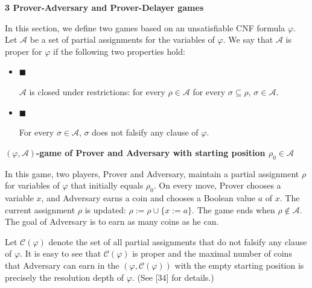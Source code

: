 \documentclass[10pt,a4paper]{article}
\begin{document}
\par\medskip\noindent\textbf{
3 Prover-Adversary and Prover-Delayer games}\par


In this section, we define two games based on an unsatisfiable CNF formula $\varphi$.
Let $\mathcal{A}$ be a set of partial assignments for the variables of $\varphi$.
We say that $\mathcal{A}$ is proper for $\varphi$ if the following two properties hold:\par


\begin{itemize}


\item 
$\blacksquare$ 


$\mathcal{A}$ is closed under restrictions: for every $\rho\in\mathcal{A}$
for every $\sigma\subseteq\rho$, $\sigma\in\mathcal{A}$.\par





\item 
$\blacksquare$ 


For every $\sigma\in\mathcal{A}$, $\sigma$ does not falsify any clause of $\varphi$.\par





\end{itemize}


\par\medskip\noindent\textbf{
$(\varphi,\mathcal{A})$-game of Prover and Adversary with starting position $\rho_{0}\in\mathcal{A}$
}\par


In this game, two players, Prover and Adversary, maintain a partial
assignment $\rho$ for variables of $\varphi$ that initially equals $\rho_{0}$.
On every move, Prover chooses a variable $x$, and Adversary earns a coin and chooses a Boolean
value $a$ of $x$.
The current assignment $\rho$ is updated: $\rho:=\rho\cup\{x:=a\}$.
The game ends when $\rho\notin\mathcal{A}$.
The goal of Adversary is to earn as many coins as he can.\par



Let $\mathcal{C}(\varphi)$ denote the set of all partial assignments that do not falsify
any clause of $\varphi$.
It is easy to see that $\mathcal{C}(\varphi)$ is proper and the maximal number of coins that
Adversary can earn in the $(\varphi,\mathcal{C}(\varphi))$ with the empty starting position
is precisely the resolution depth of $\varphi$.
(See [34] for details.)\par
\end{document}
